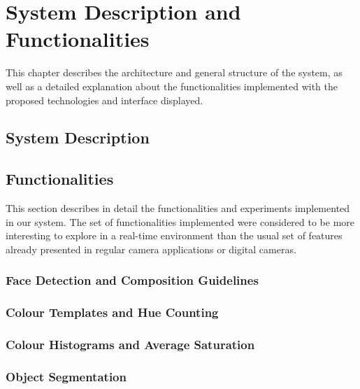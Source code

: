 
\chapter{System Description and Functionalities}
\label{cha:system}
This chapter describes the architecture and general structure of the system, as well as a detailed explanation about the functionalities implemented with the proposed technologies and interface displayed.

\section{System Description}
\label{sec:system_description}


\section{Functionalities}
\label{sec:functionalities}

This section describes in detail the functionalities and experiments implemented in our system. The set of functionalities implemented were considered to be more interesting to explore in a real-time environment than the usual set of features already presented in regular camera applications or digital cameras.

\subsection{Face Detection and Composition Guidelines}
\label{sub:face_guidelines}



\subsection{Colour Templates and Hue Counting}
\label{sub:color}


\subsection{Colour Histograms and Average Saturation}
\label{sub:histograms}

\subsection{Object Segmentation}
\label{sub:segmentation}

